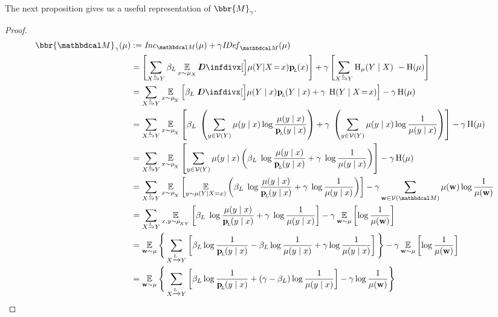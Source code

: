 The next proposition gives us a useful representation of $\bbr{M}_\gamma$.
\begin{proof}
  \begin{align*}
		\bbr{\dg M}_\gamma(\mu) &:= \Inc_{\dg M}( \mu) + \gamma \IDef{\dg M}(\mu) \\
			&= \left[\sum\alle \beta_L \E_{x\sim \mu_X}\kldiv[\Big]{ \mu(Y | X \sheq x) }{\bp(x) } \right]  + \gamma \left[\sum\alle \H_\mu(Y\mid X) ~-\H(\mu)\right]\\
			&= \sum\alle 
				\E_{x \sim \mu_{\!_X}}  \left[ \beta_L\; \kldiv[\Big]{ \mu(Y \mid x) }{\bp(Y \mid x) } + \gamma \; \H(Y \mid X\sheq x) \right]  - \gamma \H(\mu) \\ 
			&= \sum\alle 
				\E_{x \sim \mu_{\!_X}}  \left[ \beta_L\; \left(\sum_{y \in \V(Y)} \mu(y \mid x) \log\frac{\mu(y\mid x)}{\bp(y\mid x)}\right) + \gamma \; \left(\sum_{y \in \V(Y)} \mu(y\mid x) \log \frac{1}{\mu(y\mid x)} \right) \right]  - \gamma  \H(\mu) \\ 
			&= \sum\alle 
				\E_{x \sim \mu_{\!_X}}  \left[ \sum_{y \in \V(Y)} \mu(y \mid x) \left(  \beta_L\; \log\frac{\mu(y\mid x)}{\bp(y\mid x)} + \gamma \; \log \frac{1}{\mu(y\mid x)} \right) \right]  - \gamma  \H(\mu) \\
			&= \sum\alle 
				\E_{x \sim \mu_{\!_X}}  \left[ \E_{y \sim \mu(Y \mid X=x)} \left(  \beta_L\; \log\frac{\mu(y\mid x)}{\bp(y\mid x)} + \gamma \; \log \frac{1}{\mu(y\mid x)} \right) \right]  - \gamma \sum_{\mat w \in \V(\dg M)} \mu(\mat w) \log \frac{1}{\mu(\mat w)} \\  
			&= \sum\alle 
				\E_{x,y \sim \mu_{\!_{XY}}}  \left[ \beta_L\; \log\frac{\mu(y\mid x)}{\bp(y\mid x)} + \gamma \; \log \frac{1}{\mu(y\mid x)}  \right]  - \gamma  \E_{\mat w \sim \mu} \left[ \log \frac{1}{\mu(\mat w)}\right] \\
			&= \E_{\mat w \sim \mu} \Bigg\{   \sum_{ X \xrightarrow{\!\!L} Y  } \left[
				\beta_L \log \frac{1}{\bp(y\mid x)}   - \beta_L  \log \frac{1}{\mu(y \mid x)}+ \gamma \log \frac{1}{\mu(y \mid x)} \right]\Bigg\}  -  \gamma  \E_{\mat w \sim \mu} \left[\log \frac{1}{\mu(\mat w)}\right] \\
			&=  \E_{\mat w \sim \mu} \Bigg\{ \sum_{ X \xrightarrow{\!\!L} Y  } \left[
				\beta_L \log \frac{1}{\bp(y\mid x)} + (\gamma - \beta_L ) \log \frac{1}{\mu(y \mid x)} \right] - \gamma \log \frac{1}{\mu(\mat w)} \Bigg\} 
	\end{align*}
\end{proof}

